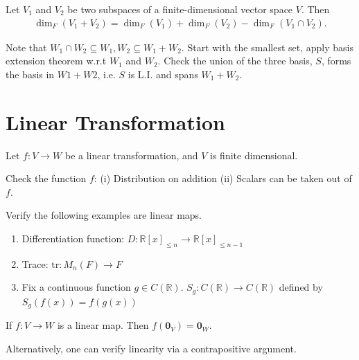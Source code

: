 \documentclass[12pt]{article}
\begin{document}
\begin{theorem}
    Let $V_1$ and $V_2$ be two subspaces of a finite-dimensional vector space $V$.
    Then
    \begin{align*}
        \dim_F(V_1+V_2)=\dim_F(V_1)+\dim_F(V_2)-\dim_F(V_1\cap V_2).
    \end{align*}
\end{theorem}


    \begin{pfbox}
    Note that $W_1\cap W_2\subseteq W_1, W_2\subseteq W_1+W_2$.
    Start with the smallest set, apply basis extension theorem w.r.t $W_1$ and $W_2$. Check the union of the three basis, $S$, forms the basis in $W1+W2$,
    i.e. $S$ is L.I. and spans $W_1+W_2$.
    \end{pfbox}



\newpage
\section{Linear Transformation}

Let $f:V\rightarrow W$ be a linear transformation, and $V$ is finite dimensional.

\begin{definition}
Check the function $f$: (i) Distribution on addition (ii) Scalars can be taken out of $f$.
\end{definition}

\begin{example}
    Verify the following examples are linear maps.
    \begin{enumerate}
        \item Differentiation function: $D: \mathbb{R}[x]_{\leq n} \rightarrow \mathbb{R}[x]_{\leq n-1}$
        \item Trace: $\text{tr}: M_n(F) \rightarrow F$
        \item Fix a continuous function $g\in C(\mathbb{R})$. $S_g: C(\mathbb{R}) \rightarrow  C(\mathbb{R}) $ defined by $S_g(f(x))=f(g(x))$
    \end{enumerate}
\end{example}

\begin{theorem}
If $f:V\rightarrow W$ is a linear map. Then $f(\mathbf{0}_V)=\mathbf{0}_W$.
\end{theorem}
Alternatively, one can verify linearity via a contrapositive argument. 
\end{document}
